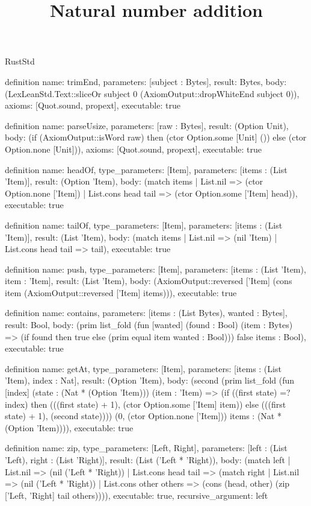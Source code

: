 \begin{lexlean}{RustStd}
\title{Natural number addition}
\begin{semanticmodule}
definition{
  name: trimEnd,
  parameters: [subject : Bytes],
  result: Bytes,
  body: (LexLeanStd.Text::sliceOr subject 0 (AxiomOutput::dropWhiteEnd subject 0)),
  axioms: [Quot.sound, propext],
  executable: true
}

definition{
  name: parseUsize,
  parameters: [raw : Bytes],
  result: (Option Unit),
  body: (if (AxiomOutput::isWord raw) then (ctor Option.some [Unit] ()) else (ctor Option.none [Unit])),
  axioms: [Quot.sound, propext],
  executable: true
}

definition{
  name: headOf,
  type_parameters: [Item],
  parameters: [items : (List 'Item)],
  result: (Option 'Item),
  body: (match items
    | List.nil => (ctor Option.none ['Item])
    | List.cons head tail => (ctor Option.some ['Item] head)),
  executable: true
}

definition{
  name: tailOf,
  type_parameters: [Item],
  parameters: [items : (List 'Item)],
  result: (List 'Item),
  body: (match items | List.nil => (nil 'Item) | List.cons head tail => tail),
  executable: true
}

definition{
  name: push,
  type_parameters: [Item],
  parameters: [items : (List 'Item), item : 'Item],
  result: (List 'Item),
  body: (AxiomOutput::reversed ['Item] (cons item (AxiomOutput::reversed ['Item] items))),
  executable: true
}

definition{
  name: contains,
  parameters: [items : (List Bytes), wanted : Bytes],
  result: Bool,
  body: (prim list_fold (fun [wanted] (found : Bool) (item : Bytes) => (if found then true else (prim equal item wanted : Bool))) false items : Bool),
  executable: true
}

definition{
  name: getAt,
  type_parameters: [Item],
  parameters: [items : (List 'Item), index : Nat],
  result: (Option 'Item),
  body: (second (prim list_fold (fun [index] (state : (Nat * (Option 'Item))) (item : 'Item) => (if ((first state) =? index) then (((first state) + 1), (ctor Option.some ['Item] item)) else (((first state) + 1), (second state)))) (0, (ctor Option.none ['Item])) items : (Nat * (Option 'Item)))),
  executable: true
}

definition{
  name: zip,
  type_parameters: [Left, Right],
  parameters: [left : (List 'Left), right : (List 'Right)],
  result: (List ('Left * 'Right)),
  body: (match left
    | List.nil => (nil ('Left * 'Right))
    | List.cons head tail => (match right
      | List.nil => (nil ('Left * 'Right))
      | List.cons other others => (cons (head, other) (zip ['Left, 'Right] tail others)))),
  executable: true,
  recursive_argument: left
}


\end{semanticmodule}
\end{lexlean}
